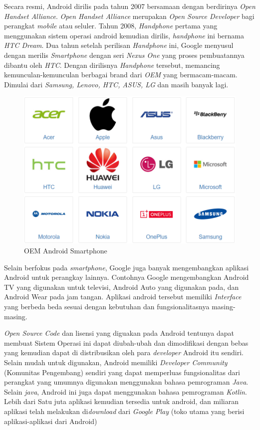 Secara resmi, Android dirilis pada tahun 2007 bersamaan dengan berdirinya \textit{Open Handset Alliance}. \textit{Open Handset Alliance} merupakan \textit{Open Source Developer} bagi perangkat \textit{mobile} atau seluler. Tahun 2008, \textit{Handphone} pertama yang menggunakan sistem operasi android kemudian dirilis, \textit{handphone} ini bernama \textit{HTC Dream}. Dua tahun setelah perilisan \textit{Handphone} ini, Google menyusul dengan merilis \textit{Smartphone} dengan seri \textit{Nexus One} yang proses pembuatannya dibantu oleh \textit{HTC}. Dengan dirilisnya \textit{Handphone} tersebut, memancing kemunculan-kemunculan berbagai brand dari \textit{OEM} yang bermacam-macam. Dimulai dari \textit{Samsung, Lenovo, HTC, ASUS, LG} dan masih banyak lagi.

\begin{figure}[!htbp]
    \centering
    \includegraphics[scale = 0.3]{pictures/merk-OEM-Android.png}
    \caption{OEM Android Smartphone}
\end{figure}

Selain berfokus pada \textit{smartphone}, Google juga banyak mengembangkan aplikasi Android untuk perangkay lainnya. Contohnya Google mengembangkan Android TV yang digunakan untuk televisi, Android Auto yang digunakan pada, dan Android Wear pada jam tangan. Aplikasi android tersebut memiliki \textit{Interface} yang berbeda beda sesuai dengan kebutuhan dan fungsionalitasnya masing-masing. 

\textit{Open Source Code} dan lisensi yang diguakan pada Android tentunya dapat membuat Sistem Operasi ini dapat diubah-ubah dan dimodifikasi dengan bebas yang kemudian dapat di distribusikan oleh para \textit{developer} Android itu sendiri. Selain mudah untuk digunakan, Android memiliki \textit{Developer Community} (Komunitas Pengembang) sendiri yang dapat memperluas fungsionalitas dari perangkat yang umumnya digunakan menggunakan bahasa pemrograman \textit{Java}. Selain \textit{java}, Android ini juga dapat menggunakan bahasa pemrograman \textit{Kotlin}. Lebih dari Satu juta aplikasi kemudian tersedia untuk android, dan miliaran aplikasi telah melakukan di\textit{download} dari \textit{Google Play} (toko utama yang berisi aplikasi-aplikasi dari Android)

